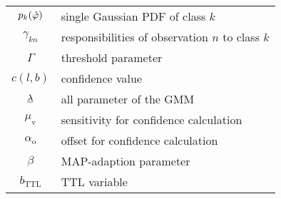 \begin{tabular}{cp{}}
  $p_k(\hat{\varphi})$  & single Gaussian \ac{PDF} of class $k$ \\
  $\gamma_{kn}$   & responsibilities of observation $n$ to class $k$\\
  $\Gamma$ & threshold parameter\\
  $c(l,b)$   & confidence value \\
  $\underline{\lambda}$  & all parameter of the \acs{GMM}\\
  $\mu_\text{v}$  & sensitivity for confidence calculation \\
  $\alpha_\text{o}$ & offset for confidence calculation \\
  $\beta$ & \acs{MAP}-adaption parameter\\
  $b_\text{TTL}$ & \acl{TTL} variable\\
%
%
\end{tabular}
